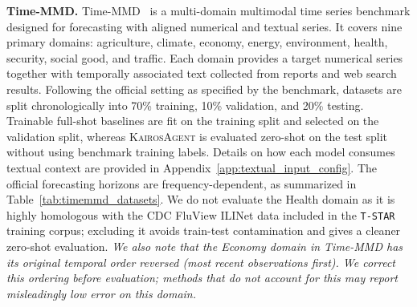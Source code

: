 \documentclass[11pt]{article}
\newcommand{\method}{\textsc{KairosAgent}\xspace}
\newcommand{\minisection}[1]{\vspace{5pt}\noindent\textbf{#1.}}
\begin{document}
\minisection{Time-MMD}
Time-MMD~\citep{liu2024time} is a multi-domain multimodal time series benchmark designed for forecasting with aligned numerical and textual series.
It covers nine primary domains: agriculture, climate, economy, energy, environment, health, security, social good, and traffic.
Each domain provides a target numerical series together with temporally associated text collected from reports and web search results.
Following the official setting as specified by the benchmark, datasets are split chronologically into 70\% training, 10\% validation, and 20\% testing.
Trainable full-shot baselines are fit on the training split and selected on the validation split, whereas \method is evaluated zero-shot on the test split without using benchmark training labels.
Details on how each model consumes textual context are provided in Appendix~\ref{app:textual_input_config}.
The official forecasting horizons are frequency-dependent, as summarized in Table~\ref{tab:timemmd_datasets}.
We do not evaluate the Health domain as it is highly homologous with the CDC FluView ILINet data included in the \texttt{T-STAR} training corpus; excluding it avoids train-test contamination and gives a cleaner zero-shot evaluation.
\textit{We also note that the Economy domain in Time-MMD has its original temporal order reversed (most recent observations first).
We correct this ordering before evaluation; methods that do not account for this may report misleadingly low error on this domain.
}

\begin{table}[htbp]
\centering
\caption{Official Time-MMD datasets and forecasting horizons. $^\dagger$Excluded from evaluation due to overlap with training data.}
\label{tab:timemmd_datasets}
\end{table}
\end{document}
